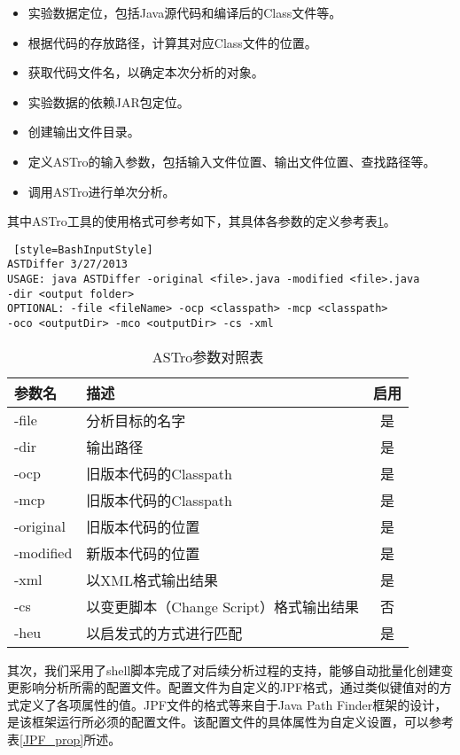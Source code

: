 \begin{itemize}
	\item 实验数据定位，包括Java源代码和编译后的Class文件等。
	\item 根据代码的存放路径，计算其对应Class文件的位置。
	\item 获取代码文件名，以确定本次分析的对象。
	\item 实验数据的依赖JAR包定位。
	\item 创建输出文件目录。
	\item 定义ASTro的输入参数，包括输入文件位置、输出文件位置、查找路径等。
	\item 调用ASTro进行单次分析。
\end{itemize}

其中ASTro工具的使用格式可参考如下，其具体各参数的定义参考表\ref {ASTro}。

\begin{lstlisting} [style=BashInputStyle]
ASTDiffer 3/27/2013
USAGE: java ASTDiffer -original <file>.java -modified <file>.java 
-dir <output folder>
OPTIONAL: -file <fileName> -ocp <classpath> -mcp <classpath> 
-oco <outputDir> -mco <outputDir> -cs -xml
\end{lstlisting}	

\begin{table}
	\caption{ASTro参数对照表}
	\label{ASTro}
	\centering
	\begin{tabular}{llc}
		\toprule[1.5pt] 
		{\heiti 参数名} & {\heiti 描述} & {\heiti 启用}\\\midrule[1pt]
		-file & 分析目标的名字 & 是 \\
		-dir & 输出路径 & 是 \\
		-ocp & 旧版本代码的Classpath & 是\\
		-mcp & 旧版本代码的Classpath & 是\\
		-original    & 旧版本代码的位置 & 是\\
		-modified   & 新版本代码的位置 & 是\\
		-xml   & 以XML格式输出结果 & 是\\
		-cs   & 以变更脚本（Change Script）格式输出结果 & 否\\
		-heu   & 以启发式的方式进行匹配 & 是\\
		\bottomrule[1.5pt]
	\end{tabular}	
\end{table}

其次，我们采用了shell脚本完成了对后续分析过程的支持，能够自动批量化创建变更影响分析所需的配置文件。配置文件为自定义的JPF格式，通过类似键值对的方式定义了各项属性的值。JPF文件的格式等来自于Java Path Finder框架的设计，是该框架运行所必须的配置文件。该配置文件的具体属性为自定义设置，可以参考表\ref {JPF_prop}所述。

